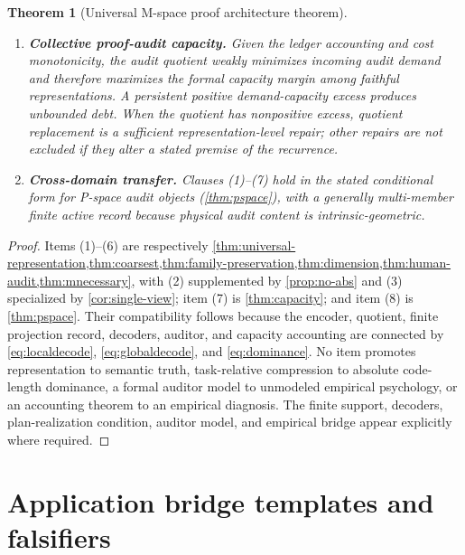 \documentclass[11pt]{article}
\theoremstyle{plain}
\newtheorem{theorem}{Theorem}[section]
\theoremstyle{definition}
\theoremstyle{remark}
\begin{document}
\begin{theorem}[Universal M-space proof architecture theorem]
\begin{enumerate}
    \item \textbf{Collective proof-audit capacity.} Given the ledger accounting and
cost monotonicity, the audit quotient weakly minimizes incoming audit demand and
therefore maximizes the formal capacity margin among faithful representations.
A persistent positive demand-capacity excess produces unbounded debt.  When the
quotient has nonpositive excess, quotient replacement is a sufficient
representation-level repair; other repairs are not excluded if they alter a
stated premise of the recurrence.
    \item \textbf{Cross-domain transfer.} Clauses (1)--(7) hold in the stated
conditional form for P-space audit objects (\cref{thm:pspace}), with a generally
multi-member finite active record because physical audit content is
intrinsic-geometric.
\end{enumerate}
\end{theorem}

\begin{proof}
Items (1)--(6) are respectively
\cref{thm:universal-representation,thm:coarsest,thm:family-preservation,thm:dimension,thm:human-audit,thm:mnecessary}, with (2) supplemented by
\cref{prop:no-abs} and (3) specialized by \cref{cor:single-view}; item (7) is
\cref{thm:capacity}; and item (8) is \cref{thm:pspace}.  Their compatibility
follows because the encoder, quotient, finite projection record, decoders,
auditor, and capacity accounting are connected by
\eqref{eq:localdecode}, \eqref{eq:globaldecode}, and \eqref{eq:dominance}.
No item promotes representation to semantic truth, task-relative compression to
absolute code-length dominance, a formal auditor model to unmodeled empirical
psychology, or an accounting theorem to an empirical diagnosis.  The finite
support, decoders, plan-realization condition, auditor model, and empirical
bridge appear explicitly where required.
\end{proof}

\section{Application bridge templates and falsifiers}
\label{sec:bridges}
\end{document}
